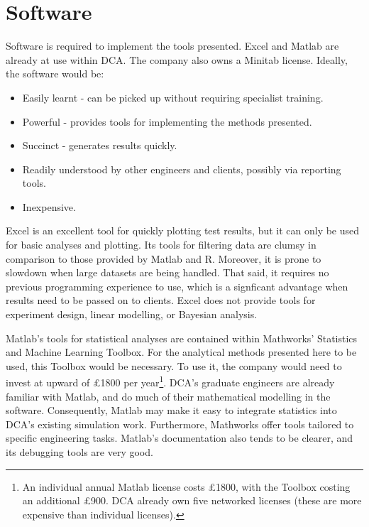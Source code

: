 \documentclass[11pt,a4paper,article]{memoir} %
\begin{document}
\section{Software}
 Software is required to implement the tools presented. Excel and Matlab are already at use within DCA. The company also owns a Minitab license. Ideally, the software would be:
 \begin{itemize}
 \item Easily learnt - can be picked up without requiring specialist training.
 \item Powerful - provides tools for implementing the methods presented.
 \item Succinct - generates results quickly.
 \item Readily understood by other engineers and clients, possibly via reporting tools.
 \item Inexpensive.
 \end{itemize}
\par
 Excel is an excellent tool for quickly plotting test results, but it can only be used for basic analyses and plotting. Its tools for filtering data are clumsy in comparison to those provided by Matlab and R. Moreover, it is prone to slowdown when large datasets are being handled. That said, it requires no previous programming experience to use, which is a signficant advantage when results need to be passed on to clients. Excel does not provide tools for experiment design, linear modelling, or Bayesian analysis.
\par
Matlab's tools for statistical analyses are contained within Mathworks' Statistics and Machine Learning Toolbox. For the analytical methods presented here to be used, this Toolbox would be necessary. To use it, the company would need to invest at upward of £1800 per year\footnote{ An individual annual Matlab license costs £1800, with the Toolbox costing an additional £900. DCA already own five networked licenses (these are more expensive than individual licenses).}. DCA's graduate engineers are already familiar with Matlab, and do much of their mathematical modelling in the software. Consequently, Matlab may make it easy to integrate statistics into DCA's existing simulation work. Furthermore, Mathworks offer tools tailored to specific engineering tasks. Matlab's documentation also tends to be clearer, and its debugging tools are very good.
\par
\end{document}
